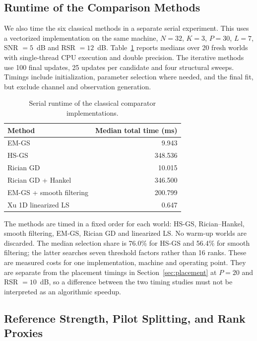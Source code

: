 \documentclass[journal]{IEEEtran}
\begin{document}
\subsection{Runtime of the Comparison Methods}
\label{sec:comparison-runtime}

We also time the six classical methods in a separate serial experiment. This uses a vectorized implementation on the same machine,
$N=32$, $K=3$, $P=30$, $L=7$, SNR $=5$~dB and RSR $=12$~dB.
Table~\ref{tab:revision-serial} reports medians over 20 fresh worlds with
single-thread CPU execution and double precision. The iterative methods
use 100 final updates, 25 updates per candidate and four structural
sweeps. Timings include initialization, parameter selection where needed,
and the final fit, but exclude channel and observation generation.

\begin{table}[!t]
\caption{Serial runtime of the classical comparator implementations.}
\label{tab:revision-serial}
\centering
\footnotesize
\begin{tabular}{lr}
\toprule
Method & Median total time (ms)\\
\midrule
EM-GS & 9.943\\
HS-GS & 348.536\\
Rician GD & 10.015\\
Rician GD + Hankel & 346.500\\
EM-GS + smooth filtering & 200.799\\
Xu 1D linearized LS & 0.647\\
\bottomrule
\end{tabular}
\end{table}

The methods are timed in a fixed order for each world: HS-GS,
Rician--Hankel, smooth filtering, EM-GS, Rician GD and linearized LS.
No warm-up worlds are discarded. The median selection share is 76.0\%
for HS-GS and 56.4\% for smooth filtering; the latter searches seven
threshold factors rather than 16 ranks. These are measured costs for one
implementation, machine and operating point.
They are separate from the placement timings in Section~\ref{sec:placement} at
$P=20$ and RSR $=10$~dB, so a difference between the two timing studies
must not be interpreted as an algorithmic speedup.

\subsection{Reference Strength, Pilot Splitting, and Rank Proxies}
\label{sec:sensitivity-summary}
\end{document}
